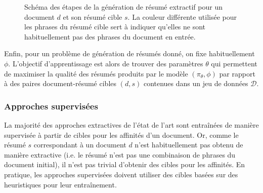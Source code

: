\begin{figure}[h!]
\begin{center}
\end{center}
\caption{Schéma des étapes de la génération de résumé extractif pour un document $d$ et 
son résumé cible $s$. La couleur différente utilisée pour les phrases du résumé 
cible sert à indiquer qu'elles ne sont habituellement pas des phrases du document
en entrée.}
\label{fig:summ}
\end{figure}

Enfin, pour un problème de génération de résumés donné, on fixe habituellement $\phi$.
L'objectif d'apprentissage est alors de trouver des paramètres $\theta$
qui permettent de maximiser la qualité des résumés produits par le modèle
$(\pi_\theta, \phi)$ par rapport à des paires document-résumé cibles $(d, s)$ contenues
dans un jeu de données $\mathcal{D}$.

\subsubsection*{Approches supervisées}

La majorité des approches extractives de l'état de l'art sont entraînées 
de manière supervisée à partir de cibles pour les affinités d'un document.
Or, comme le résumé $s$ correspondant à un document $d$ n'est habituellement pas obtenu de
manière extractive (i.e. le résumé n'est pas une combinaison de phrases du document initial),
il n'est pas trivial d'obtenir des cibles pour les affinités.
En pratique, les approches supervisées doivent utiliser des cibles basées sur des heuristiques pour
leur entraînement.

